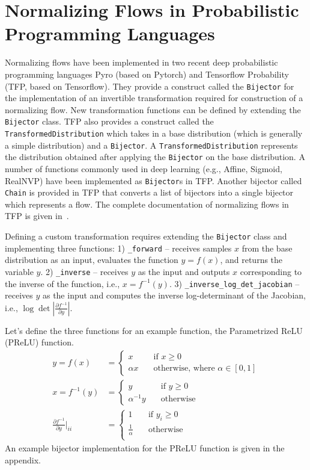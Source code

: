 \documentclass[runningheads]{llncs}
\begin{document}
\section{Normalizing Flows in Probabilistic Programming Languages}
Normalizing flows have been implemented in two recent deep probabilistic programming languages Pyro (based on Pytorch) and Tensorflow Probability (TFP, based on Tensorflow). They provide a construct called the \texttt{Bijector} for the implementation of an invertible transformation required for construction of a normalizing flow. New transformation functions can be defined by extending the \texttt{Bijector} class. TFP also provides a construct called the \texttt{TransformedDistribution} which takes in a base distribution (which is generally a simple distribution) and a \texttt{Bijector}. A \texttt{TransformedDistribution} represents the distribution obtained after applying the \texttt{Bijector} on the base distribution. A number of functions commonly used in deep learning (e.g., Affine, Sigmoid, RealNVP) have been implemented as \texttt{Bijector}s in TFP. Another bijector called \texttt{Chain} is provided in TFP that converts a list of bijectors into a single bijector which represents a flow. The complete documentation of normalizing flows in TFP is given in~\cite{dillon2017tensorflow}.

Defining a custom transformation requires extending the \texttt{Bijector} class and implementing three functions: 1) \texttt{\_forward} -- receives samples $x$ from the base distribution as an input, evaluates the function $y = f(x)$, and returns the variable $y$. 2) \texttt{\_inverse} -- receives $y$ as the input and outputs $x$ corresponding to the inverse of the function, i.e., $x = f^{-1}(y)$. 3) \texttt{\_inverse\_log\_det\_jacobian} -- receives $y$ as the input and computes the inverse log-determinant of the Jacobian, i.e., $\log \det \left|\frac{\partial f^{-1}}{\partial y}\right|$. 

Let's define the three functions for an example function, the Parametrized ReLU (PReLU) function.
\begin{align}
y = f(x) &= \begin{cases}
x\quad&\text{if } x \geq 0\\
\alpha x\quad&\text{otherwise, where }\alpha\in [0, 1]
\end{cases}\\
x = f^{-1}(y) &= \begin{cases}
y\quad&\text{if } y \geq 0\\
\alpha^{-1} y\quad&\text{otherwise}
\end{cases}\\
\frac{\partial f^{-1}}{\partial y}\Bigg|_{ii} &= 
\begin{cases}
1\quad&\text{if } y_i \geq 0\\
\frac{1}{\alpha}\quad&\text{otherwise}\\
\end{cases}
\end{align}
An example bijector implementation for the PReLU function is given in the appendix.
\end{document}
